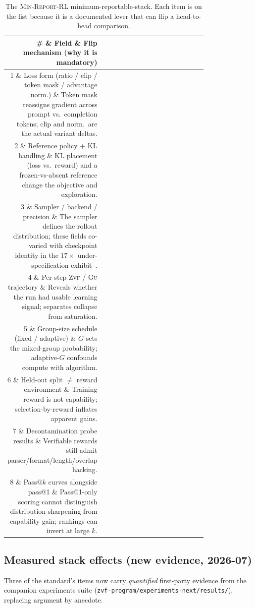 \documentclass[11pt]{article}
\newcommand{\zvf}{\textsc{Zvf}}
\newcommand{\gu}{\textsc{Gu}}
\newcommand{\minreport}{\textsc{Min-Report-RL}}
\begin{document}
\begin{table}[t]
\centering
\caption{The \minreport{} minimum-reportable-stack. Each item is on the list
because it is a documented lever that can flip a head-to-head comparison.}
\label{tab:checklist}
\small
\begin{tabular}{@{}rp{0.30\linewidth}p{0.50\linewidth}@{}}
\toprule
\# \& \textbf{Field} \& \textbf{Flip mechanism (why it is mandatory)}\\
\midrule
1 \& Loss form (ratio / clip / token mask / advantage norm.) \& Token mask reassigns gradient across prompt vs.\ completion tokens; clip and norm.\ are the actual variant deltas.\\
2 \& Reference policy + KL handling \& KL placement (loss vs.\ reward) and a frozen-vs-absent reference change the objective and exploration.\\
3 \& Sampler / backend / precision \& The sampler defines the rollout distribution; these fields co-varied with checkpoint identity in the $17\times$ under-specification exhibit~\citep{zvfaudit2026}.\\
4 \& Per-step \zvf{} / \gu{} trajectory \& Reveals whether the run had usable learning signal; separates collapse from saturation.\\
5 \& Group-size schedule (fixed / adaptive) \& $G$ sets the mixed-group probability; adaptive-$G$ confounds compute with algorithm.\\
6 \& Held-out split $\neq$ reward environment \& Training reward is not capability; selection-by-reward inflates apparent gains.\\
7 \& Decontamination probe results \& Verifiable rewards still admit parser/format/length/overlap hacking.\\
8 \& Pass@$k$ curves alongside pass@1 \& Pass@1-only scoring cannot distinguish distribution sharpening from capability gain; rankings can invert at large $k$.\\
\bottomrule
\end{tabular}
\end{table}

\subsection{Measured stack effects (new evidence, 2026-07)}
\label{sec:measured}

Three of the standard's items now carry \emph{quantified} first-party
evidence from the companion experiments suite
(\texttt{zvf-program/experiments-next/results/}), replacing argument by
anecdote.
\end{document}

